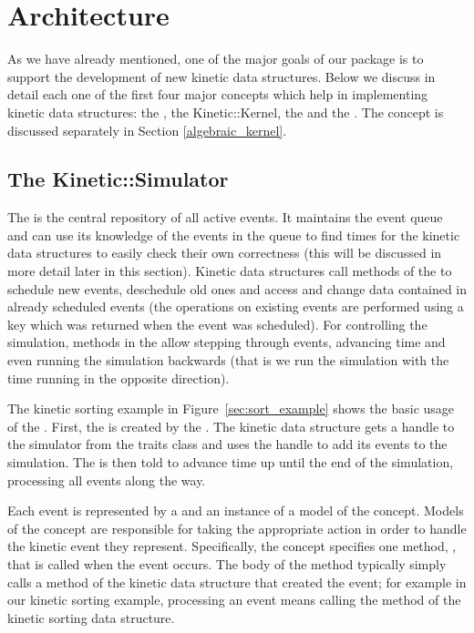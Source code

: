 
\section{Architecture}
\label{sec:architecture}

As we have already mentioned, one of the major goals of our package is
to support the development of new kinetic data structures. Below we
discuss in detail each one of the first four major concepts which help
in implementing kinetic data structures: the ,
the Kinetic::Kernel, the  and the
.  The 
concept is discussed separately in Section \ref{algebraic_kernel}.

\subsection{The Kinetic::Simulator}
\label{simulator}

The  is the central repository of all active events.
It maintains the event queue and can use its knowledge of the events
in the queue to find times for the kinetic data structures to easily
check their own correctness (this will be discussed in more detail
later in this section). Kinetic data structures call methods of the
 to schedule new events, deschedule old ones and
access and change data contained in already scheduled events (the
operations on existing events are performed using a key which was
returned when the event was scheduled).  For controlling the
simulation, methods in the  allow stepping through
events, advancing time and even running the simulation backwards (that
is we run the simulation with the time running in the opposite
direction).

The kinetic sorting example in Figure~\ref{sec:sort_example} shows the
basic usage of the . First, the 
is created by the . The kinetic data structure
gets a handle to the simulator from the traits class and uses the
handle to add its events to the simulation. The  is
then told to advance time up until the end of the simulation,
processing all events along the way.

Each event is represented by a  and an instance of a
model of the  concept.  Models of the 
concept are responsible for taking the appropriate action in order to
handle the kinetic event they represent.  Specifically, the
 concept specifies one method,
, that is called when the event occurs.
The body of the  method typically
simply calls a method of the kinetic data structure that created the
event; for example in our kinetic sorting example, processing an event
means calling the 
method of the kinetic sorting data structure.

